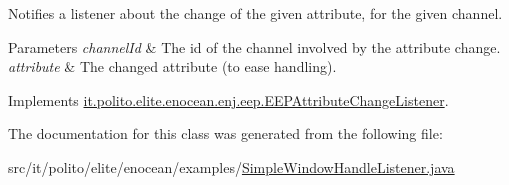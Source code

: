 Notifies a listener about the change of the given attribute, for the given channel. 
\begin{DoxyParams}{Parameters}
{\em channel\+Id} & The id of the channel involved by the attribute change. \\
\hline
{\em attribute} & The changed attribute (to ease handling). \\
\hline
\end{DoxyParams}


Implements \hyperlink{interfaceit_1_1polito_1_1elite_1_1enocean_1_1enj_1_1eep_1_1_e_e_p_attribute_change_listener_a8ed543f4de048252dfd133116d488382}{it.\+polito.\+elite.\+enocean.\+enj.\+eep.\+E\+E\+P\+Attribute\+Change\+Listener}.



The documentation for this class was generated from the following file\+:\begin{DoxyCompactItemize}
\item 
src/it/polito/elite/enocean/examples/\hyperlink{_simple_window_handle_listener_8java}{Simple\+Window\+Handle\+Listener.\+java}\end{DoxyCompactItemize}
